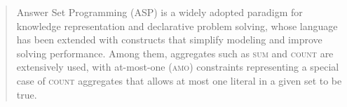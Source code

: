 \documentclass[preprint,authoryear]{elsarticle}
\theoremstyle{definition}
\begin{document}
\begin{frontmatter}
\begin{abstract}
{\color{blue}
Answer Set Programming (ASP) is a widely adopted paradigm for knowledge representation and declarative problem solving, whose language has been extended with constructs that simplify modeling and improve solving performance. Among them, aggregates such as \textsc{sum} and \textsc{count} are extensively used, with at-most-one (\textsc{amo}) constraints representing a special case of \textsc{count} aggregates that allows at most one literal in a given set to be true.

}
\end{abstract}
\end{frontmatter}
\end{document}
